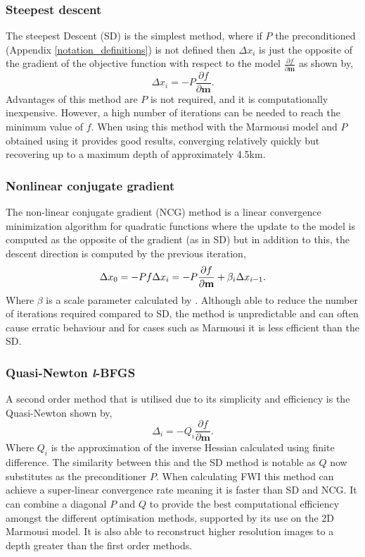 \subsubsection{Steepest descent}
The steepest Descent (SD) is the simplest method, where if $P$ the preconditioned (Appendix \ref{notation_definitions}) is not defined then $\Delta x_{i}$ is just the opposite of the gradient of the objective function with respect to the model $\frac{\partial f}{\partial\textbf{m}}$ as shown by, 
\begin{equation}
\Delta x_{i} = -P \frac{\partial f}{\partial\textbf{m}}. 
\label{steepest_descent}
\end{equation}
Advantages of this method are $P$ is not required, and it is computationally inexpensive. However, a high number of iterations can be needed to reach the minimum value of $f$. When using this method with the Marmousi model and $P$ obtained using \citet{shin2001improved} it provides good results, converging relatively quickly but recovering up to a maximum depth of approximately 4.5km.

\subsubsection{Nonlinear conjugate gradient}
The non-linear conjugate gradient (NCG) method is a linear convergence minimization algorithm for quadratic functions where the update to the model is computed as the opposite of the gradient (as in SD) but in addition to this, the descent direction is computed by the previous iteration, 
\begin{equation}
\Delta x_{0} = -Pf \\ 
\Delta x_{i} = -P \frac{\partial f}{\partial\textbf{m}} + \beta_{i} \Delta x_{i-1}.
\label{NCG}
\end{equation}
Where $\beta$ is a scale parameter calculated by \citet{dai1999nonlinear}. Although able to reduce the number of iterations required compared to SD, the method is unpredictable and can often cause erratic behaviour and for cases such as Marmousi it is less efficient than the SD. 

\subsubsection{Quasi-Newton \textit{l}-BFGS }
A second order method that is utilised due to its simplicity and efficiency \citep{nocedal1980updating} is the Quasi-Newton shown by, 
\begin{equation}
\Delta_{i} = -Q_{i} \frac{\partial f}{\partial\textbf{m}}.
\end{equation}
Where $Q_{i}$ is the approximation of the inverse Hessian calculated using finite difference. The similarity between this and the SD method is notable as $Q$ now substitutes as the preconditioner $P$. When calculating FWI this method can achieve a super-linear convergence rate meaning it is faster than SD and NCG. It can combine a diagonal $P$ and $Q$ to provide the best computational efficiency amongst the different optimisation methods, supported by its use on the 2D Marmousi model. It is also able to reconstruct higher resolution images to a depth greater than the first order methods.

